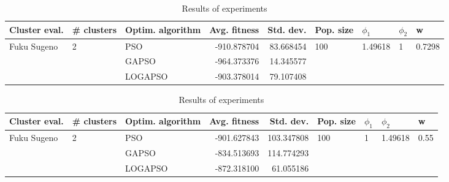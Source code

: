 \documentclass{article}
\begin{document}
\begin{table}
\centering
\caption{Results of experiments}
\begin{tabular}{lllrrllll}
\toprule
               Cluster eval. &        \# clusters & Optim. algorithm &  Avg. fitness &  Std. dev. &            Pop. size &               $\phi_{1}$ &         $\phi_{2}$ &                       w \\
\midrule
\multirow{3}{*}{Fuku Sugeno} & \multirow{3}{*}{2} &              PSO &   -910.878704 &  83.668454 & \multirow{3}{*}{100} & \multirow{3}{*}{1.49618} & \multirow{3}{*}{1} & \multirow{3}{*}{0.7298} \\
                             &                    &            GAPSO &   -964.373376 &  14.345577 &                      &                          &                    &                         \\
                             &                    &          LOGAPSO &   -903.378014 &  79.107408 &                      &                          &                    &                         \\
\bottomrule
\end{tabular}
\end{table}
\begin{table}
\centering
\caption{Results of experiments}
\begin{tabular}{lllrrllll}
\toprule
               Cluster eval. &        \# clusters & Optim. algorithm &  Avg. fitness &  Std. dev. &            Pop. size &         $\phi_{1}$ &               $\phi_{2}$ &                     w \\
\midrule
\multirow{3}{*}{Fuku Sugeno} & \multirow{3}{*}{2} &              PSO &   -901.627843 & 103.347808 & \multirow{3}{*}{100} & \multirow{3}{*}{1} & \multirow{3}{*}{1.49618} & \multirow{3}{*}{0.55} \\
                             &                    &            GAPSO &   -834.513693 & 114.774293 &                      &                    &                          &                       \\
                             &                    &          LOGAPSO &   -872.318100 &  61.055186 &                      &                    &                          &                       \\
\bottomrule
\end{tabular}
\end{table}
\end{document}
